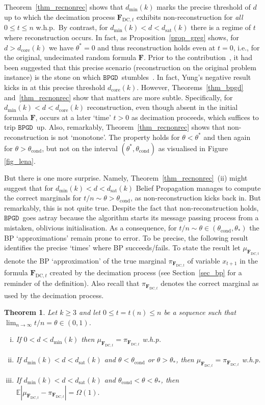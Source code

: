 \documentclass[10pt,reqno]{amsart}
\numberwithin{equation}{section}
\renewcommand{\vec}[1]{\boldsymbol{#1}}
\newcommand\dmin{d_{\mathrm{min}}}
\newcommand\dcore{d_{\mathrm{core}}}
\newcommand\dsat{d_{\mathrm{sat}}}
\newcommand{\FDC}[1]{\PHI_{\mathrm{DC},{#1}}}
\newcommand{\tcond}{\theta_{\mathrm{cond}}}
\newcommand{\BPGD}{\ensuremath{\mathtt{BPGD}}}
\newcommand\PHI{\vec F}
\newcommand\Erw{\mathbb{E}}
\newcommand\ex{\Erw}
\newcommand\abs[1]{\left|{#1}\right|}
\newcommand{\whp}{w.h.p.}
\newcommand\Prop{Proposition}
\newcommand\Thm{Theorem}
\newcommand\Sec{Section}
\newtheorem{theorem}[definition]{Theorem}
\begin{document}
\Thm~\ref{thm_recnonrec} shows that $\dmin(k)$ marks the precise threshold of $d$ up to which the decimation process $\FDC{t}$ exhibits non-reconstruction for {\em all} $0\leq t\leq n$ \whp\
By contrast, for $\dmin(k)<d<\dsat(k)$ there is a regime of $t$ where reconstruction occurs.
In fact, as \Prop~\ref{prop_greg} shows, for $d>\dcore(k)$ we have $\theta^*=0$ and thus reconstruction holds even at $t=0$, i.e., for the original, undecimated random formula $\PHI$.
Prior to the contribution~\cite{RTS}, it had been suggested that this precise scenario (reconstruction on the original problem instance) is the stone on which \BPGD\ stumbles~\cite{Braunstein}.
In fact, Yung's negative result kicks in at this precise threshold $\dcore(k)$.
However, \Thm s~\ref{thm_bpgd} and~\ref{thm_recnonrec} show that matters are more subtle.
Specifically, for $\dmin(k)<d<\dcore(k)$ reconstruction, even though absent in the initial formula $\PHI$, occurs at a later `time' $t>0$ as decimation proceeds, which suffices to trip \BPGD\ up.
Also, remarkably, \Thm~\ref{thm_recnonrec} shows that non-reconstruction is not `monotone'.
The property holds for $\theta<\theta^*$ and then again for $\theta>\tcond$, but not on the interval $(\theta^*,\tcond)$ as visualised in Figure \ref{fig_lena}.

But there is one more surprise.
Namely, \Thm~\ref{thm_recnonrec}~(ii) might suggest that for $\dmin(k)<d<\dsat(k)$ Belief Propagation manages to compute the correct marginals for $t/n\sim \theta >\tcond$, as non-reconstruction kicks back in.
But remarkably, this is not quite true.
Despite the fact that non-reconstruction holds, \BPGD\ goes astray because the algorithm starts its message passing process from a mistaken, oblivious initialisation.
As a consequence, for $t/n\sim\theta\in(\tcond,\theta_*)$ the BP `approximations' remain prone to error.
To be precise, the following result identifies the precise `times' where BP succeeds/fails.
To state the result let $\mu_{\FDC{t}}$ denote the BP `approximation' of the true marginal $\pi_{\FDC{t}}$ of variable $x_{t+1}$ in the formula $\FDC t$ created by the decimation process (see \Sec~\ref{sec_bp} for a reminder of the definition).
Also recall that $\pi_{\FDC t}$ denotes the correct marginal as used by the decimation process.

\begin{theorem}\label{thm_cond}
	Let $k\geq3$ and let $0\leq t=t(n)\leq n$ be a sequence such that $\lim_{n\to\infty}t/n=\theta\in(0,1)$.
	\begin{enumerate}[(i)]
		\item If $0<d<\dmin(k)$ then $\mu_{\FDC{t}}=\pi_{\FDC{t}}$ \whp\
		\item If $\dmin(k)<d<\dsat(k)$ and $\theta<\tcond$ or $\theta>\theta_*$, then $\mu_{\FDC{t}}=\pi_{\FDC{t}}$ \whp
		\item If $\dmin(k)<d<\dsat(k)$ and $\tcond<\theta<\theta_*$, then $\ex\abs{\mu_{\FDC{t}}-\pi_{\FDC{t}}}=\Omega(1).$
	\end{enumerate}
\end{theorem}
\end{document}
